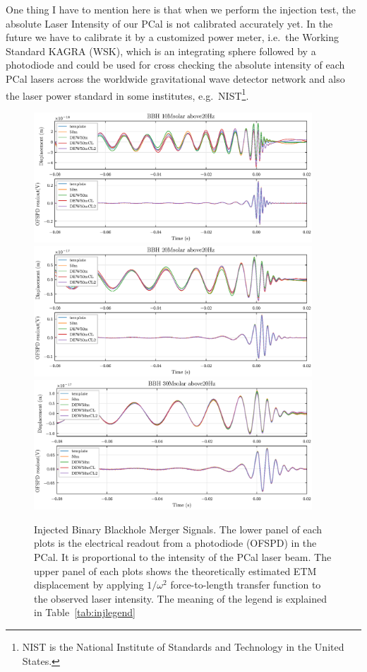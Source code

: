 One thing I have to mention here is that when we perform the injection test, the absolute Laser Intensity of our PCal is not calibrated accurately yet. In the future we have to calibrate it by a customized power meter, i.e.~the Working Standard KAGRA (WSK), which is an integrating sphere followed by a photodiode and could be used for cross checking the absolute intensity of each PCal lasers across the worldwide gravitational wave detector network and also the laser power standard in some institutes, e.g.~NIST\footnote{NIST is the National Institute of Standards and Technology in the United States.}.
 


  

\begin{figure}[hbt!]
\centering
\includegraphics[width=0.93\textwidth]{figure/inj/10.eps}
\includegraphics[width=0.93\textwidth]{figure/inj/20.eps}
\includegraphics[width=0.93\textwidth]{figure/inj/30.eps}
\caption[Injected Binary Blackhole Merger Signals]{Injected Binary Blackhole Merger Signals. The lower panel of each plots is the electrical readout from a photodiode (OFSPD) in the PCal. It is proportional to the intensity of the PCal laser beam. The upper panel of each plots shows the theoretically estimated ETM displacement by applying $1/\omega^2$ force-to-length transfer function to the observed laser intensity. The meaning of the legend is explained in Table~\ref{tab:injlegend}}
\label{fig:bbhinj}
\end{figure}


